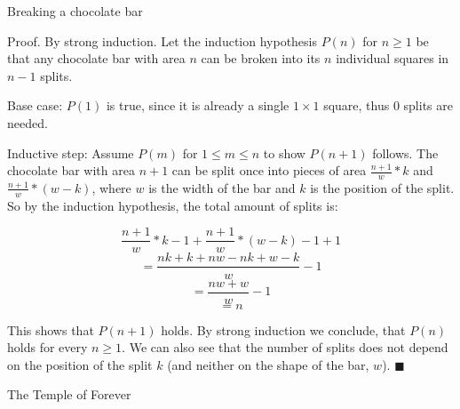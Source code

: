 \documentclass[../main.tex]{subfiles}
\begin{document}
\begin{questions}

  \question Breaking a chocolate bar
  \begin{solution}
    Proof. By strong induction. Let the induction hypothesis $P(n)$ for $n \ge 1$ be that any chocolate bar with area $n$ can be broken into its $n$ individual squares in $n-1$ splits.

    Base case: $P(1)$ is true, since it is already a single $1 \times 1$ square, thus 0 splits are needed.

    Inductive step: Assume $P(m)$ for $1 \le m \le n$ to show $P(n+1)$ follows. The chocolate bar with area $n+1$ can be split once into pieces of area $\frac{n+1}{w}*k$ and $\frac{n+1}{w}*(w-k)$, where $w$ is the width of the bar and $k$ is the position of the split. So by the induction hypothesis, the total amount of splits is:

    $$
    \frac{n+1}{w}*k-1 + \frac{n+1}{w}*(w-k)-1 + 1
    $$
    $$
    = \frac{nk+k+nw-nk+w-k}{w} - 1
    $$
    $$
    = \frac{nw+w}{w} - 1
    $$
    $$
    = n
    $$

    This shows that $P(n+1)$ holds. By strong induction we conclude, that $P(n)$ holds for every $n \ge 1$. We can also see that the number of splits does not depend on the position of the split $k$ (and neither on the shape of the bar, $w$). $\blacksquare$
  \end{solution}

  \question The Temple of Forever

\end{questions}
\end{document}
